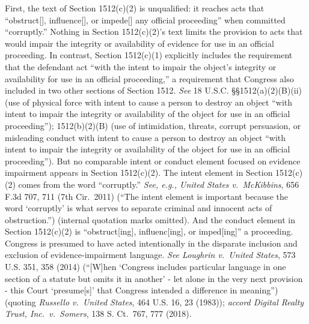 First, the text of Section 1512(c)(2) is unqualified: it reaches acts that “obstruct[], influence[], or impede[] any official proceeding” when committed “corruptly.”
Nothing in Section 1512(c)(2)’s text limits the provision to acts that would impair the integrity or availability of evidence for use in an official proceeding.
In contrast, Section 1512(c)(1) explicitly includes the requirement that the defendant act “with the intent to impair the object’s integrity or availability for use in an official proceeding,” a requirement that Congress also included in two other sections of Section 1512.
\textit{See} 18 U.S.C. \S\S 1512(a)(2)(B)(ii) (use of physical force with intent to cause a person to destroy an object “with intent to impair the integrity or availability of the object for use in an official proceeding”);
1512(b)(2)(B) (use of intimidation, threats, corrupt persuasion, or misleading conduct with intent to cause a person to destroy an object “with intent to impair the integrity or availability of the object for use in an official proceeding”).
But no comparable intent or conduct element focused on evidence impairment appears in Section 1512(c)(2).
The intent element in Section 1512(c)(2) comes from the word “corruptly.”
\textit{See, e.g., United States v.\ McKibbins}, 656 F.3d 707, 711 (7th Cir.~2011) (“The intent element is important because the word ‘corruptly’ is what serves to separate criminal and innocent acts of obstruction.”) (internal quotation marks omitted).
And the conduct element in Section 1512(c)(2) is “obstruct[ing], influenc[ing], or imped[ing]” a proceeding.
Congress is presumed to have acted intentionally in the disparate inclusion and exclusion of evidence-impairment language.
\textit{See Loughrin v.\ United States}, 573 U.S. 351, 358 (2014) (“[W]hen ‘Congress includes particular language in one section of a statute but omits it in another’ - let alone in the very next provision - this Court ‘presume[s]’ that Congress intended a difference in meaning”) (quoting \textit{Russello v.\ United States}, 464 U.S. 16, 23 (1983));
\textit{accord Digital Realty Trust, Inc.\ v.\ Somers}, 138 S. Ct.~767, 777 (2018).


